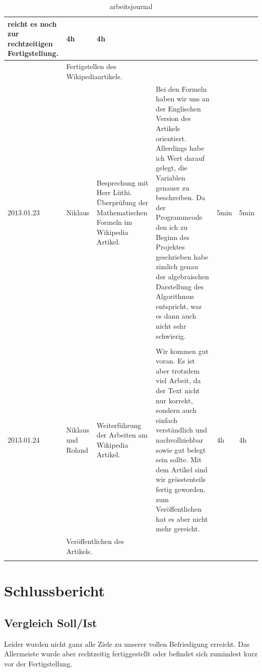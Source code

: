 \documentclass[11pt,paper=a4,final]{scrartcl}
\begin{document}
\begin{landscape}
\begin{longtable}{|p{1.8cm}|p{1.5cm}|p{5.0cm}|p{11.0cm}|l|l|}
    reicht es noch zur rechtzeitigen Fertigstellung.&
    4h & 4h \\ \hline \nopagebreak
    \multicolumn{2}{|l|}{\bf Pendenzen} &\multicolumn{2}{p{16.0cm}|}{
    Fertigstellen des Wikipediaartikels.
    }  & \multicolumn{2}{l|}{} \\ \hline
    \hline
    2013.01.23 & Niklaus &
    Besprechung mit Herr L\"uthi. \"Uberpr\"ufung der Mathematischen Formeln im
    Wikipedia Artikel. &
    Bei den Formeln haben wir uns an der Englischen Version des Artikels
    orientiert. Allerdings habe ich Wert darauf gelegt, die Variablen genauer zu
    beschreiben. Da der Programmcode den ich zu Beginn des Projektes geschrieben
    habe zimlich genau der algebraischen Darstellung des Algorithmus entspricht,
    war es dann auch nicht sehr schwierig.&
    5min & 5min \\ \hline \nopagebreak
    \multicolumn{2}{|l|}{\bf Pendenzen} &\multicolumn{2}{p{16.0cm}|}{
    }  & \multicolumn{2}{l|}{} \\ \hline
    \hline
    2013.01.24 & Niklaus und Roland &
    Weiterf\"uhrung der Arbeiten am Wikipedia Artikel. &
    Wir kommen gut voran. Es ist aber trotzdem viel Arbeit, da der Text nicht
    nur korrekt, sondern auch einfach verst\"andlich und nachvollziehbar sowie
    gut belegt sein sollte. Mit dem Artikel sind wir gr\"osstenteils fertig
    geworden, zum Ver\"offentlichen hat es aber nicht mehr gereicht.&
    4h & 4h \\ \hline \nopagebreak
    \multicolumn{2}{|l|}{\bf Pendenzen} &\multicolumn{2}{p{16.0cm}|}{
    Ver\"offentlichen des Artikels.
    }  & \multicolumn{2}{l|}{} \\ \hline
  \caption{arbeitsjournal}
  \end{longtable}
\end{landscape}
\section{Schlussbericht}
\subsection{Vergleich Soll/Ist}
Leider wurden nicht ganz alle Ziele zu unserer vollen Befriedigung erreicht.
Das Allermeiste wurde aber rechtzeitig fertiggestellt oder befindet sich
zumindest kurz vor der Fertigstellung.
\end{document}
